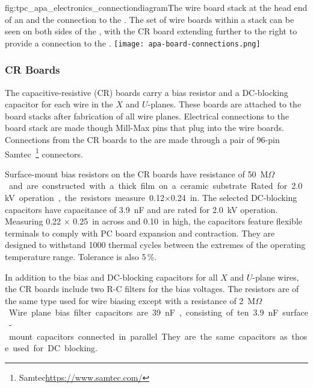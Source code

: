 \begin{dunefigure}{fig:tpc_apa_electronics_connectiondiagram}{The wire board stack at the head end of an  and the connection to the . The set of wire boards within a stack can be seen on both sides of the , with the CR board extending further to the right to provide a connection to the .}
\setlength{\fboxsep}{0pt}
\setlength{\fboxrule}{0.5pt}
\texttt{[image: apa-board-connections.png]}
\end{dunefigure} 


\subsubsection{CR Boards}
\label{sec:crboards}

The capacitive-resistive (CR) boards carry a bias resistor and a DC-blocking capacitor for each wire in the $X$ and $U$-planes. These boards are attached to the board stacks after fabrication of all wire planes.   Electrical connections to the board stack are made though Mill-Max pins that plug into the wire boards. Connections from the CR boards to the  are made through a pair of \num{96}-pin Samtec~\footnote{Samtec\texttrademark \url{https://www.samtec.com/}} connectors.

Surface-mount bias resistors on the CR boards have resistance of \SI{50}{M$\Omega$} and are constructed with a thick film on a ceramic substrate. Rated for \SI{2.0}{kV} operation, the resistors measure \num{0.12}$\times$\SI{0.24}{in}. The selected DC-blocking capacitors have capacitance of \SI{3.9}{nF} and are rated for \SI{2.0}{kV} operation. Measuring 0.22 $\times$ \SI{0.25}{in} across and \SI{0.10}{in} high, the capacitors feature flexible terminals to comply with PC board expansion and contraction. They are designed to withstand \num{1000} thermal cycles between the extremes of the operating temperature range. Tolerance is also \num{5}\,\%.

In addition to the bias and DC-blocking capacitors for all $X$ and $U$-plane wires, the CR boards include two R-C filters for the bias voltages. The resistors are of the same type used for wire biasing except with a resistance of \SI{2}{M$\Omega$}. Wire plane bias filter capacitors are \SI{39}{nF}, consisting of ten \SI{3.9}{nF} surface-mount capacitors connected in parallel. They are the same capacitors as those used for DC blocking.

